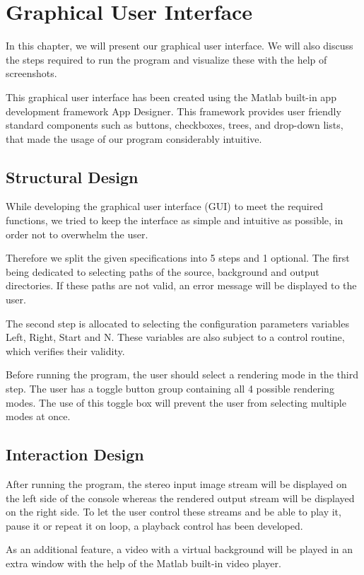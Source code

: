 \section{Graphical User Interface}
\label{GUI}
In this chapter, we will present our graphical user interface. We will also discuss the steps required to run the program and visualize these with the help of screenshots.

\medskip

This graphical user interface has been created using the Matlab built-in app development framework App Designer. This framework provides user friendly standard components such as buttons, checkboxes, trees, and drop-down lists, that made the usage of our program considerably intuitive. 

\subsection{Structural Design}

While developing the graphical user interface (GUI) to meet the required  functions, we tried to keep the interface as simple and intuitive as possible, in order not to overwhelm the user. 

\medskip

Therefore we split the given specifications into 5 steps and 1 optional. The first being dedicated to selecting paths of the source, background and output directories. If these paths are not valid, an error message will be displayed to the user.

\medskip

The second step is allocated to selecting the configuration parameters variables Left, Right, Start and N. These variables are also subject to a control routine, which verifies their validity.

\medskip

Before running the program, the user should select a rendering mode in the third step. The user has a toggle button group containing all 4 possible rendering modes. The use of this toggle box will prevent the user from selecting multiple modes at once. 

\subsection{Interaction Design}

After running the program, the stereo input image stream will be displayed on the left side of the console whereas the rendered output stream will be displayed on the right side. To let the user control these streams and be able to play it, pause it or repeat it on loop, a playback control has been developed.

\medskip

As an additional feature, a video with a virtual background will be played in an extra window with the help of the Matlab built-in video player. 